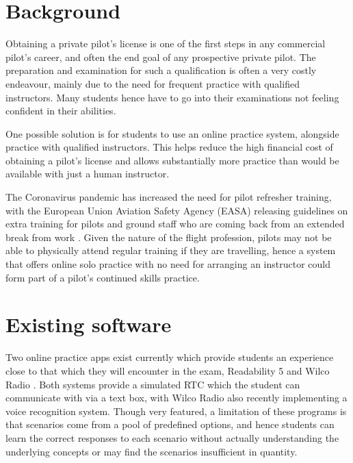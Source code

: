 \section{Background}
Obtaining a private pilot's license is one of the first steps in any commercial pilot's career, and often the end goal of any prospective private pilot.
The preparation and examination for such a qualification is often a very costly endeavour, mainly due to the need for frequent practice with qualified instructors.
Many students hence have to go into their examinations not feeling confident in their abilities.

One possible solution is for students to use an online practice system, alongside practice with qualified instructors. This helps reduce the high financial cost of obtaining a pilot's license and allows substantially more practice than would be available with just a human instructor.

The Coronavirus pandemic has increased the need for pilot refresher training, with the European Union Aviation Safety Agency (EASA) releasing guidelines on extra training for pilots and ground staff who are coming back from an extended break from work \cite{EASA-training-post-covid}. Given the nature of the flight profession, pilots may not be able to physically attend regular training if they are travelling, hence a system that offers online solo practice with no need for arranging an instructor could form part of a pilot's continued skills practice.
\section{Existing software}
Two online practice apps exist currently which provide students an experience close to that which they will encounter in the exam, Readability 5 \cite{readability5} and Wilco Radio \cite{wilcoradio}.
Both systems provide a simulated RTC which the student can communicate with via a text box, with Wilco Radio also recently implementing a voice recognition system.
Though very featured, a limitation of these programs is that scenarios come from a pool of predefined options, and hence students can learn the correct responses to each scenario without actually understanding the underlying concepts or may find the scenarios insufficient in quantity.